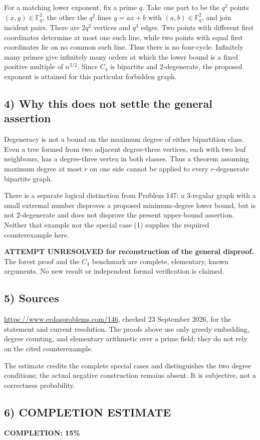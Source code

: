 For a matching lower exponent, fix a prime $q$. Take one part to be the $q^2$ points $(x,y)\in\mathbb F_q^2$, the other the $q^2$ lines $y=ax+b$ with $(a,b)\in\mathbb F_q^2$, and join incident pairs. There are $2q^2$ vertices and $q^3$ edges. Two points with different first coordinates determine at most one such line, while two points with equal first coordinates lie on no common such line. Thus there is no four-cycle. Infinitely many primes give infinitely many orders at which the lower bound is a fixed positive multiple of $n^{3/2}$. Since $C_4$ is bipartite and 2-degenerate, the proposed exponent is attained for this particular forbidden graph.

\subsection*{4) Why this does not settle the general assertion}
Degeneracy is not a bound on the maximum degree of either bipartition class. Even a tree formed from two adjacent degree-three vertices, each with two leaf neighbours, has a degree-three vertex in both classes. Thus a theorem assuming maximum degree at most $r$ on one side cannot be applied to every $r$-degenerate bipartite graph.

There is a separate logical distinction from Problem 147: a 3-regular graph with a small extremal number disproves a proposed minimum-degree lower bound, but is not 2-degenerate and does not disprove the present upper-bound assertion. Neither that example nor the special case (1) supplies the required counterexample here.

\textbf{ATTEMPT UNRESOLVED for reconstruction of the general disproof.} The forest proof and the $C_4$ benchmark are complete, elementary, known arguments. No new result or independent formal verification is claimed.

\subsection*{5) Sources}
\url{https://www.erdosproblems.com/146}, checked 23 September 2026, for the statement and current resolution. The proofs above use only greedy embedding, degree counting, and elementary arithmetic over a prime field; they do not rely on the cited counterexample.

The estimate credits the complete special cases and distinguishes the two degree conditions; the actual negative construction remains absent. It is subjective, not a correctness probability.
\subsection*{6) COMPLETION ESTIMATE}
\textbf{COMPLETION: 15\%}
